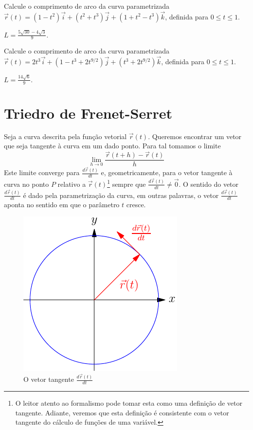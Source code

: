 \begin{exer} \label{exe_co_arc4}
Calcule o comprimento de arco da curva parametrizada $\vec{r}(t) = (1-t^2) \vec{i} + (t^2+t^3) \vec{j} + (1+t^2-t^3)\vec{k}$, definida para $0 \leq t \leq 1$.
\end{exer}
\begin{resp} $ L = \frac{5 \sqrt{30}-4\sqrt{3}}{9} $.
\end{resp}



\begin{exer} \label{exe_co_arc5}
Calcule o comprimento de arco da curva parametrizada $\vec{r}(t) = 2t^3 \vec{i} + (1-t^3+2t^{9/2}) \vec{j} + (t^3+2t^{9/2})\vec{k}$, definida para $0 \leq t \leq 1$.
\end{exer}
\begin{resp}
  $ L = \frac{14\sqrt{6}}{9}.$
\end{resp}



\section{Triedro de Frenet-Serret}

Seja a curva descrita pela função vetorial $\vec{r}(t)$. Queremos encontrar um vetor que seja tangente à curva em um dado ponto. Para tal tomamos o limite
$$\lim_{h\to 0} \frac{\vec{r}(t+h)-\vec{r}(t)}{h}$$
Este limite converge para $\frac{d\vec{r}(t)}{dt}$ e, geometricamente, para o vetor tangente à curva no ponto $P$ relativo a $\vec{r}(t)$\footnote{O leitor atento ao formalismo pode tomar esta como uma definição de vetor tangente. Adiante, veremos que esta definição é consistente com o vetor tangente do cálculo de funções de uma variável.} sempre que $\frac{d\vec{r}(t)}{dt} \neq \vec{0}$. O sentido do vetor $\frac{d\vec{r}(t)}{dt}$ é dado pela parametrização da curva, em outras palavras, o vetor $\frac{d\vec{r}(t)}{dt}$ aponta no sentido em que o parâmetro $t$ cresce.


\begin{figure}%
\begin{center}
    \includegraphics{./cap_curvas/figs/vetor_tangente_circunferencia}
\caption{O vetor tangente $\frac{d\vec{r}(t)}{dt}$}\label{circtang}
  \end{center}
\end{figure}


